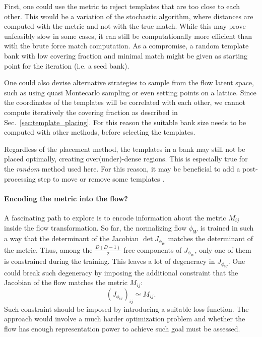 \documentclass[twocolumn,showpacs,preprintnumbers,nofootinbib,prd,
superscriptaddress,10pt]{revtex4-2}
\begin{document}
First, one could use the metric to reject templates that are too close to each other. This would be a variation of the stochastic algorithm, where distances are computed with the metric and not with the true match. While this may prove unfeasibly slow in some cases, it can still be computationally more efficient than with the brute force match computation. As a compromise, a random template bank with low covering fraction and minimal match might be given as starting point for the iteration (i.e. a seed bank).

One could also devise alternative strategies to sample from the flow latent space, such as using quasi Montecarlo sampling or even setting points on a lattice.
Since the coordinates of the templates will be correlated with each other, we cannot compute iteratively the covering fraction as described in Sec.~\ref{sec:template_placing}. For this reason the suitable bank size needs to be computed with other methods, before selecting the templates.

Regardless of the placement method, the templates in a bank may still not be placed optimally, creating over(under)-dense regions. This is especially true for the {\it random} method used here. For this reason, it may be beneficial to add a post-processing step to move or remove some templates \cite{Indik:2017vqq}.

\paragraph{Encoding the metric into the flow?}

A fascinating path to explore is to encode information about the metric $M_{ij}$ inside the flow transformation.
So far, the normalizing flow $\phi_W$ is trained in such a way that the determinant of the Jacobian $\det J_{\phi_W}$ matches the determinant of the metric.
Thus, among the $\frac{D(D-1)}{2}$ free components of $J_{\phi_W}$, only one of them is constrained during the training. This leaves a lot of degeneracy in $J_{\phi_W}$.
One could break such degeneracy by imposing the additional constraint that the Jacobian of the flow matches the metric $M_{ij}$:
\begin{equation}
	(J_{\phi_W})_{ij} \simeq M_{ij}.
\end{equation}
Such constraint should be imposed by introducing a suitable loss function.
The approach would involve a much harder optimization problem and whether the flow has enough representation power to achieve such goal must be assessed.
\end{document}
